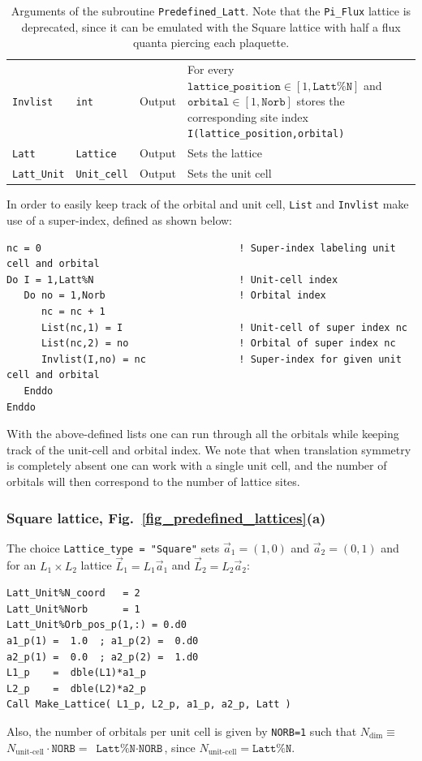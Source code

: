 \begin{table}[h!]
\begin{center}
\begin{tabular}{@{} p{}  p{} p{} p{}  @{}}
		\texttt{Invlist}         & \texttt{int}        & Output &  For every $\texttt{lattice\_position} \in [1,\texttt{Latt\%N}]$ and $\texttt{orbital} \in [1,\texttt{Norb}]$ stores the corresponding site index \texttt{I(lattice\_position,orbital)}\\
		\texttt{Latt}            & \texttt{Lattice}    & Output & Sets the lattice\\
		\texttt{Latt\_Unit}      & \texttt{Unit\_cell} & Output & Sets the unit cell\\
		\bottomrule
	\end{tabular}
\caption{Arguments of the subroutine \texttt{Predefined\_Latt}.   Note that the \texttt{Pi\_Flux} lattice is deprecated, since it can be emulated with the Square lattice with half a flux quanta piercing each plaquette.}		\label{table:predefined_lattices}
\end{center}
\end{table}

In order to easily keep track of the orbital and unit cell, \texttt{List} and \texttt{Invlist} make use of a super-index, defined as shown below:
\begin{lstlisting}[style=fortran]
nc = 0                                  ! Super-index labeling unit cell and orbital
Do I = 1,Latt%N                         ! Unit-cell index 
   Do no = 1,Norb                       ! Orbital index
      nc = nc + 1
      List(nc,1) = I                    ! Unit-cell of super index nc
      List(nc,2) = no                   ! Orbital of super index nc
      Invlist(I,no) = nc                ! Super-index for given unit cell and orbital
   Enddo
Enddo
\end{lstlisting}
With the above-defined lists one can run through all the orbitals while keeping track of the unit-cell and orbital index. We note that when translation symmetry is completely absent one can work with a single unit cell, and the number of orbitals will then correspond to the number of lattice sites. 


\subsubsection{Square lattice, Fig.~\ref{fig_predefined_lattices}(a)}

The choice \texttt{Lattice\_type = "Square"}   sets $\vec{a}_1 =  (1,0) $ and $\vec{a}_2 =  (0,1) $  and for an $L_1 \times L_2$  lattice  $\vec{L}_1 = L_1 \vec{a}_1$ and  $\vec{L}_2 = L_2 \vec{a}_2$:
\begin{lstlisting}[style=fortran]
Latt_Unit%N_coord   = 2
Latt_Unit%Norb      = 1
Latt_Unit%Orb_pos_p(1,:) = 0.d0 
a1_p(1) =  1.0  ; a1_p(2) =  0.d0
a2_p(1) =  0.0  ; a2_p(2) =  1.d0
L1_p    =  dble(L1)*a1_p
L2_p    =  dble(L2)*a2_p
Call Make_Lattice( L1_p, L2_p, a1_p, a2_p, Latt )
\end{lstlisting}
Also, the number of orbitals per unit cell is given by \texttt{NORB=1} such that   $N_{\mathrm{dim}}   \equiv$ $N_{\text{unit-cell}}   \cdot \texttt{NORB}  =$ $\texttt{Latt\%N} \cdot \texttt{NORB}$, since $N_{\text{unit-cell}} = \texttt{Latt\%N}$.


